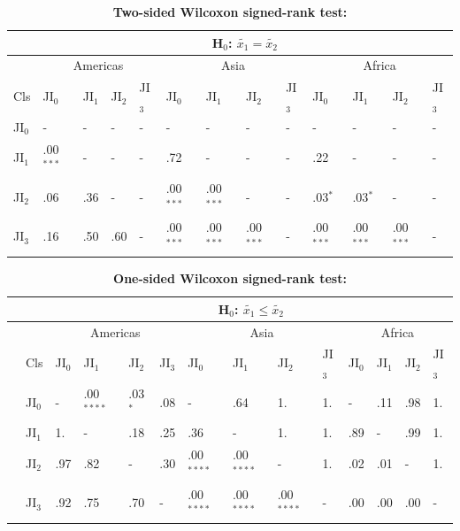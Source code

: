 			\begin{table}[ht]
				\centering
				\caption[Two-sided Wilcoxon signed-rank test]{\textbf{Two-sided Wilcoxon signed-rank test:}}
				\label{tab:wilcoxontwosided}
				\begin{tabular}{lllllllllllll}
					\hline
					& \multicolumn{12}{c}{H$_0$: $\tilde{x_1}=\tilde{x_2}$} \\\hline
					& \multicolumn{4}{c}{Americas} & \multicolumn{4}{c}{Asia} & \multicolumn{4}{c}{Africa} \\
					Cls & JI$_0$ & JI$_1$ & JI$_2$ & JI$_3$ & JI$_0$ & JI$_1$ & JI$_2$ & JI$_3$ & JI$_0$ & JI$_1$ & JI$_2$ & JI$_3$ \\\hline
					JI$_0$ & - & - & - & - & - & - & - & - & - & - & - & - \\
					JI$_1$ & .00$^{***}$ & - & - & - & .72 & - & - & - & .22 & - & - & - \\
					JI$_2$ & .06 & .36 & - & - & .00$^{***}$ & .00$^{***}$ & - & - & .03$^{*}$ & .03$^{*}$  & - & - \\
					JI$_3$ & .16 & .50 & .60 & - & .00$^{***}$ & .00$^{***}$ & .00$^{***}$ & - & .00$^{***}$ & .00$^{***}$ & .00$^{***}$ & - \\\hline
				\end{tabular}
			\end{table}
			\begin{table}[ht]
				\centering
				\caption[One-sided Wilcoxon signed-rank test]{\textbf{One-sided Wilcoxon signed-rank test:}}
				\label{tab:wilcoxononesided}
				\begin{tabular}{llllllllllllll}
					\hline
					& & \multicolumn{12}{c}{H$_0$: $\tilde{x_1}\leq\tilde{x_2}$} \\\hline
					& & \multicolumn{4}{c}{Americas} & \multicolumn{4}{c}{Asia} & \multicolumn{4}{c}{Africa} \\
					& Cls & JI$_0$ & JI$_1$ & JI$_2$ & JI$_3$ & JI$_0$ & JI$_1$ & JI$_2$ & JI$_3$ & JI$_0$ & JI$_1$ & JI$_2$ & JI$_3$ \\\hline
					\multirow{4}{*}{\STAB{\rotatebox[origin=c]{90}{H$_0$: $\tilde{x_1}\geq\tilde{x_2}$}}} & JI$_0$ & - & .00$^{****}$ & .03$^{*}$ & .08 & - & .64 & 1. & 1. & - & .11 & .98 & 1. \\
					& JI$_1$ & 1. & - & .18 & .25 & .36 & - & 1. & 1. & .89 & - & .99 & 1. \\
					& JI$_2$ & .97 & .82 & - & .30 & .00$^{****}$ & .00$^{****}$ & - & 1. & .02 & .01 & - & 1. \\
					& JI$_3$ & .92 & .75 & .70 & - & .00$^{****}$ & .00$^{****}$ & .00$^{****}$ & - & .00 & .00 & .00 & - \\\hline
				\end{tabular}
			\end{table}

